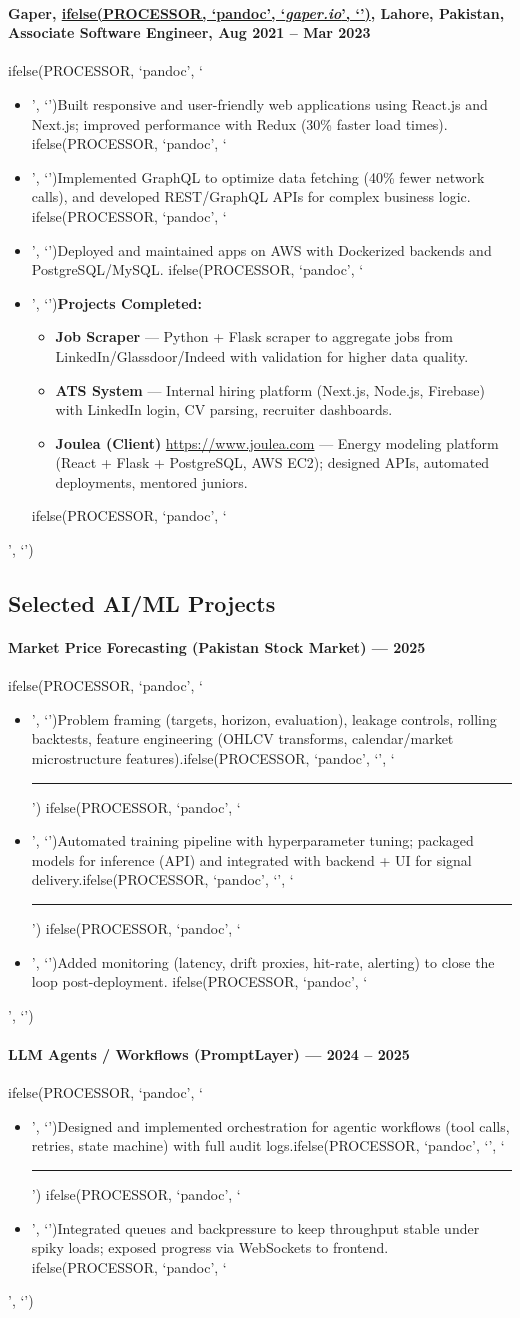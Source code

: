 \documentclass[a4paper,11pt]{article}
\newcommand{\chref}[2]{\href{#1}
{ifelse(PROCESSOR, `pandoc', `#2', `\underline{\smash{#2}}')}}
\newcommand{\itchref}[2]{\chref{#1}{\textit{#2}}}  %
\newcommand{\nesteditemize}[1]{%
    \vspace{2pt}%
    \begin{itemize}%
        \setlength{\itemsep}{2pt}%
        #1%
      \end{itemize}%
    }
\newcommand{\chrule}{ifelse(PROCESSOR, `pandoc', `', `\vspace{3pt}\hrule')}
\newcommand{\pdbeginitemize}{ifelse(PROCESSOR, `pandoc', `\begin{itemize}', `')}
\newcommand{\pditem}{ifelse(PROCESSOR, `pandoc', `\item', `')}
\newcommand{\pdenditemize}{ifelse(PROCESSOR, `pandoc', `\end{itemize}', `')}
\begin{document}
\paragraph*{Gaper, \itchref{https://gaper.io}{gaper.io}, Lahore, Pakistan, Associate Software Engineer, Aug 2021 -- Mar 2023}
\pdbeginitemize
\pditem Built responsive and user-friendly web applications using React.js and Next.js; improved performance with Redux (30\% faster load times).
\pditem Implemented GraphQL to optimize data fetching (40\% fewer network calls), and developed REST/GraphQL APIs for complex business logic.
\pditem Deployed and maintained apps on AWS with Dockerized backends and PostgreSQL/MySQL.
\pditem \textbf{Projects Completed:}
    \nesteditemize{
        \item \textbf{Job Scraper} — Python + Flask scraper to aggregate jobs from LinkedIn/Glassdoor/Indeed with validation for higher data quality.
        \item \textbf{ATS System} — Internal hiring platform (Next.js, Node.js, Firebase) with LinkedIn login, CV parsing, recruiter dashboards.
        \item \textbf{Joulea (Client)} \url{https://www.joulea.com} — Energy modeling platform (React + Flask + PostgreSQL, AWS EC2); designed APIs, automated deployments, mentored juniors.
    }
\pdenditemize



\subsection*{Selected AI/ML Projects}
\paragraph*{Market Price Forecasting (Pakistan Stock Market) — 2025}
\pdbeginitemize
\pditem Problem framing (targets, horizon, evaluation), leakage controls, rolling backtests, feature engineering (OHLCV transforms, calendar/market microstructure features).\chrule
\pditem Automated training pipeline with hyperparameter tuning; packaged models for inference (API) and integrated with backend + UI for signal delivery.\chrule
\pditem Added monitoring (latency, drift proxies, hit-rate, alerting) to close the loop post-deployment.
\pdenditemize

\paragraph*{LLM Agents / Workflows (PromptLayer) — 2024 -- 2025}
\pdbeginitemize
\pditem Designed and implemented orchestration for agentic workflows (tool calls, retries, state machine) with full audit logs.\chrule
\pditem Integrated queues and backpressure to keep throughput stable under spiky loads; exposed progress via WebSockets to frontend.
\pdenditemize
\end{document}
